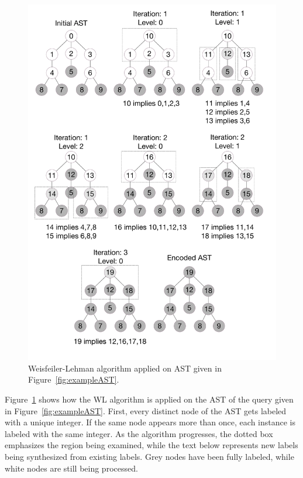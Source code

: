 \begin{figure}[h!]
\centering
\includegraphics[width=\columnwidth]{graphics/WLExample}
\caption{Weisfeiler-Lehman algorithm applied on AST given in Figure~\ref{fig:exampleAST}.}
\label{fig:wlexample}
\end{figure}

Figure~\ref{fig:wlexample} shows how the WL algorithm is applied on the AST of the query given in Figure~\ref{fig:exampleAST}. First, every distinct node of the AST gets labeled with a unique integer.  If the same node appears more than once, each instance is labeled with the same integer.
As the algorithm progresses, the dotted box emphasizes the region being examined, while the text below represents new labels being synthesized from existing labels.  Grey nodes have been fully labeled, while white nodes are still being processed.

